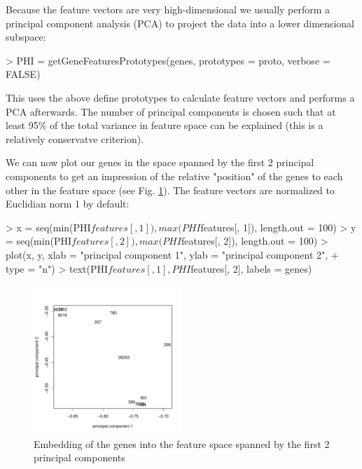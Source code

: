 \documentclass[12pt,a4paper]{article}
\begin{document}
Because the feature vectors are very high-dimensional we usually perform a principal component analysis (PCA) to project the data into a lower dimensional subspace:
\begin{Schunk}
\begin{Sinput}
> PHI = getGeneFeaturesPrototypes(genes, prototypes = proto, verbose = FALSE)
\end{Sinput}
\end{Schunk}

This uses the above define prototypes to calculate feature vectors and performs a PCA afterwards. The number of principal components is chosen such that at least 95\% of the total variance in feature space can be explained (this is a relatively conservatve criterion). 

We can now plot our genes in the space spanned by the first 2 principal components to get an impression of the relative  "position" of the genes to each other in the feature space (see Fig. \ref{Fig:PCAPlot}). The feature vectors are normalized to Euclidian norm 1 by default:
\begin{Schunk}
\begin{Sinput}
> x = seq(min(PHI$features[, 1]), max(PHI$features[, 1]), length.out = 100)
> y = seq(min(PHI$features[, 2]), max(PHI$features[, 2]), length.out = 100)
> plot(x, y, xlab = "principal component 1", ylab = "principal component 2", 
+     type = "n")
> text(PHI$features[, 1], PHI$features[, 2], labels = genes)
\end{Sinput}
\end{Schunk}

\begin{figure}
\begin{center}
\includegraphics[width=0.5\textwidth]{GOPCAExample.pdf}
\caption{\label{Fig:PCAPlot}Embedding of the genes into the feature space spanned by the first 2 principal components}
\end{center}
\end{figure}
\end{document}
